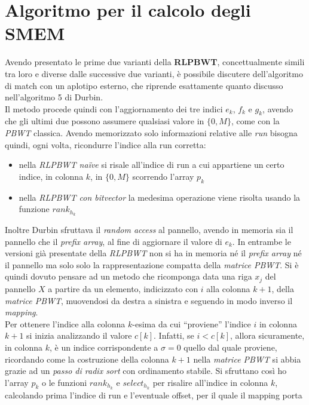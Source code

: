 \section{Algoritmo per il calcolo degli SMEM}
Avendo presentato le prime due varianti della \textbf{RLPBWT}, concettualmente
simili tra loro e diverse dalle successive due varianti, è possibile discutere
dell'algoritmo di match con un aplotipo esterno, che riprende esattamente quanto
discusso nell'algoritmo 5 di Durbin.\\
Il metodo procede quindi con l'aggiornamento dei tre indici $e_k$, $f_k$ e
$g_k$, avendo che gli ultimi due possono assumere qualsiasi valore in $\{0,M\}$,
come con la \textit{PBWT} classica. Avendo memorizzato solo informazioni
relative alle \textit{run} bisogna quindi, ogni volta, ricondurre l'indice alla
run corretta:
\begin{itemize}
  \item nella \textit{RLPBWT na\"{i}ve} si risale all'indice di run a cui appartiene
  un certo indice, in colonna $k$, in $\{0,M\}$ scorrendo l'array $p_k$
  \item nella \textit{RLPBWT con bitvector} la medesima operazione viene risolta
  usando la funzione $rank_{h_k}$
\end{itemize}
Inoltre Durbin sfruttava il \textit{random access} al pannello, avendo in
memoria sia il pannello che il \textit{prefix array}, al fine di aggiornare il
valore di $e_k$. In entrambe le versioni già presentate della \textit{RLPBWT}
non si ha in memoria né il \textit{prefix array} né il pannello ma solo solo la
rappresentazione compatta della \textit{matrice PBWT}. Si è quindi dovuto
pensare ad un metodo che ricomponga data una riga $x_j$ del pannello $X$ a
partire da un elemento, indicizzato con $i$ alla colonna $k+1$, della
\textit{matrice PBWT}, muovendosi da destra a sinistra e seguendo in modo
inverso il \textit{mapping}.\\ 
Per ottenere l'indice alla colonna $k$-esima da cui ``proviene'' l'indice $i$ in
colonna $k+1$ si inizia analizzando il valore $c[k]$. Infatti, se $i<c[k]$,
allora sicuramente, in colonna $k$, è un indice corrispondente a $\sigma=0$
quello dal quale proviene, ricordando come la costruzione della colonna $k+1$
nella \textit{matrice PBWT} si abbia grazie ad un \textit{passo di radix sort}
con ordinamento stabile. Si sfruttano così ho l'array $p_k$ o le funzioni
$rank_{h_k}$ e $select_{h_k}$ per risalire all'indice in colonna $k$, calcolando
prima l'indice di run e l'eventuale offset, per il quale il mapping porta
